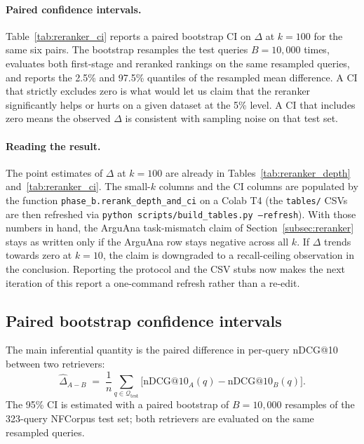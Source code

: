 \documentclass[11pt,a4paper]{article}
\begin{document}
\paragraph{Paired confidence intervals.}
Table~\ref{tab:reranker_ci} reports a paired bootstrap CI on $\Delta$
at $k=100$ for the same six pairs. The bootstrap resamples the test
queries $B = 10{,}000$ times, evaluates both first-stage and reranked
rankings on the same resampled queries, and reports the 2.5\% and
97.5\% quantiles of the resampled mean difference. A CI that strictly
excludes zero is what would let us claim that the reranker
significantly helps or hurts on a given dataset at the 5\% level. A
CI that includes zero means the observed $\Delta$ is consistent with
sampling noise on that test set.

\begin{table}[ht]
    \centering
    \caption{Paired bootstrap 95\% CI for the BGE-reranker $\Delta$ at
    $k=100$. $\hat{\Delta}$ matches the corresponding row in
    Table~\ref{tab:reranker}. The CI and $P(\text{rerank}>\text{FS})$
    columns require the Colab rerun.}
    \label{tab:reranker_ci}
    \small
    
\end{table}

\paragraph{Reading the result.}
The point estimates of $\Delta$ at $k=100$ are already in
Tables~\ref{tab:reranker_depth} and~\ref{tab:reranker_ci}. The
small-$k$ columns and the CI columns are populated by the function
\texttt{phase\_b.rerank\_depth\_and\_ci} on a Colab T4 (the
\texttt{tables/} CSVs are then refreshed via \texttt{python
scripts/build\_tables.py --refresh}). With those numbers in hand, the
ArguAna task-mismatch claim of Section~\ref{subsec:reranker} stays as
written only if the ArguAna row stays negative across all $k$. If
$\Delta$ trends towards zero at $k=10$, the claim is downgraded to a
recall-ceiling observation in the conclusion. Reporting the protocol
and the CSV stubs now makes the next iteration of this report a
one-command refresh rather than a re-edit.

\subsection{Paired bootstrap confidence intervals}
\label{subsec:paired_bootstrap}

The main inferential quantity is the paired difference in per-query
nDCG@10 between two retrievers:
\begin{equation}
    \hat{\Delta}_{A-B} \;=\; \frac{1}{n}\sum_{q \in \mathcal{Q}_{\text{test}}}
    \bigl[\text{nDCG@10}_A(q) - \text{nDCG@10}_B(q)\bigr].
    \label{eq:paired_delta}
\end{equation}
The 95\% CI is estimated with a paired bootstrap of $B = 10{,}000$
resamples of the 323-query NFCorpus test set; both retrievers are
evaluated on the same resampled queries.
\end{document}
